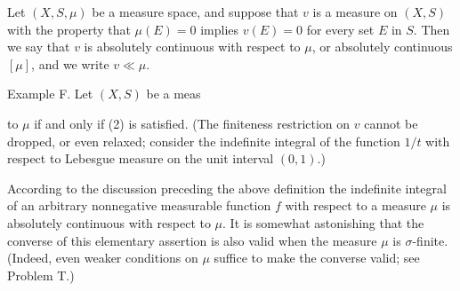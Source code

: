 Let $(X, S, \mu)$ be a measure space, and suppose that $v$ is a measure on $(X, S)$ with the property that $\mu(E) = 0$ implies $v(E) = 0$ for every set $E$ in $S$. Then we say that $v$ is absolutely continuous with respect to $\mu$, or absolutely continuous $[\mu]$, and we write $v \ll \mu$.

Example F. Let $(X, S)$ be a meas

to $\mu$ if and only if (2) is satisfied. (The finiteness restriction on $v$ cannot be dropped, or even relaxed; consider the indefinite integral of the function $1/t$ with respect to Lebesgue measure on the unit interval $(0, 1)$.)

According to the discussion preceding the above definition the indefinite integral of an arbitrary nonnegative measurable function $f$ with respect to a measure $\mu$ is absolutely continuous with respect to $\mu$. It is somewhat astonishing that the converse of this elementary assertion is also valid when the measure $\mu$ is $\sigma$-finite. (Indeed, even weaker conditions on $\mu$ suffice to make the converse valid; see Problem T.)

